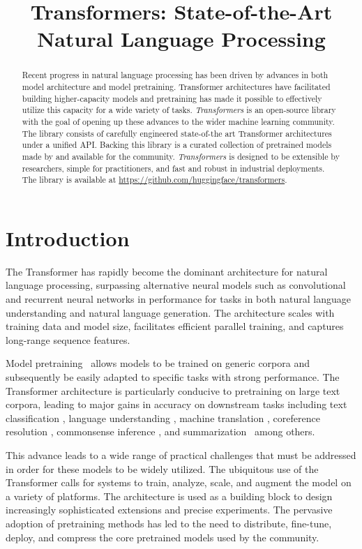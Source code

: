 \title{Transformers: State-of-the-Art Natural Language Processing}

\begin{abstract}
Recent progress in natural language processing has been driven by advances in both model architecture and model pretraining. Transformer architectures have facilitated building higher-capacity models and pretraining has made it possible to effectively utilize this capacity for a wide variety of tasks. \textit{Transformers} is an open-source library with the goal of opening up these advances to the wider machine learning community. The library consists of carefully engineered state-of-the art Transformer architectures under a unified API. Backing this library is a curated collection of pretrained models made by and available for the community. \textit{Transformers} is designed to be extensible by researchers, simple for practitioners, and fast and robust in industrial deployments.  The library is available at \url{https://github.com/huggingface/transformers}.
\end{abstract}

\section{Introduction}

The Transformer \cite{Vaswani2017-bg} has rapidly become the dominant architecture for natural language processing, surpassing alternative neural models such as convolutional  and recurrent neural networks in performance for tasks in both natural language understanding and natural language generation. The architecture scales with training data and model size, facilitates efficient parallel training, and captures long-range sequence features.

Model pretraining~\cite{McCann2017-uz,Howard2018UniversalLM,Peters2018-jy,Devlin2018-gk} allows models to be trained on generic corpora and subsequently be easily adapted to specific tasks with strong performance. The Transformer architecture is particularly conducive to pretraining on large text corpora, leading to major gains in accuracy on downstream tasks including text classification \citep{Yang2019XLNetGA}, language understanding \citep{Liu2019RoBERTaAR, Wang2018GLUEAM, Wang2019SuperGLUEAS}, machine translation \citep{Lample2019CrosslingualLM}, coreference resolution \citep{joshi2019spanbert}, commonsense inference \citep{Bosselut2019COMETCT}, and summarization~\cite{Lewis2019-ak} among others.

This advance leads to a wide range of practical challenges that must be addressed in order for these models to be widely utilized. The ubiquitous use of the Transformer calls for systems to train, analyze, scale, and augment the model on a variety of platforms. The architecture is used as a building block to design increasingly sophisticated extensions and precise experiments. The pervasive adoption of pretraining methods has led to the need to distribute, fine-tune, deploy, and compress the core pretrained models used by the community.

